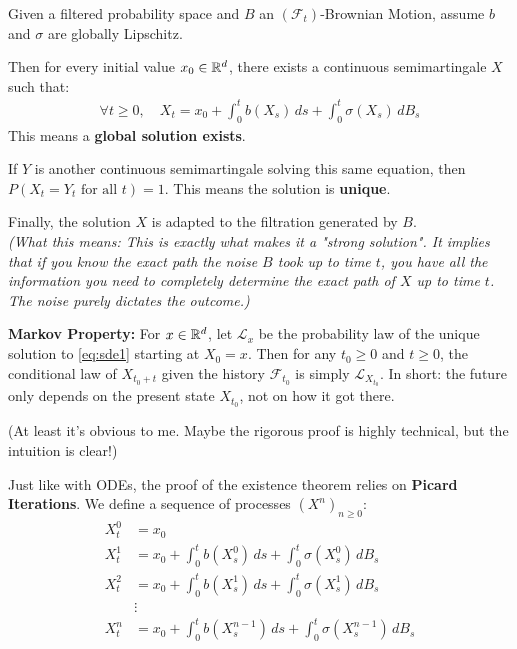 \begin{izrek}
    Given a filtered probability space and $B$ an $(\mathcal{F}_t)$-Brownian Motion, assume $b$ and $\sigma$ are globally Lipschitz. 
    
    Then for every initial value $x_0 \in \mathbb{R}^d$, there exists a continuous semimartingale $X$ such that:
    \begin{align}
        \forall t \geq 0, \quad X_t = x_0 + \int_0^t b(X_s) \, ds + \int_0^t \sigma(X_s) \, dB_s
        \label{eq:sde1}
    \end{align}
    This means a \textbf{global solution exists}.

    If $Y$ is another continuous semimartingale solving this same equation, then $P(X_t = Y_t \text{ for all } t) = 1$. This means the solution is \textbf{unique}.

    Finally, the solution $X$ is adapted to the filtration generated by $B$. \\
    \textit{(What this means: This is exactly what makes it a "strong solution". It implies that if you know the exact path the noise $B$ took up to time $t$, you have all the information you need to completely determine the exact path of $X$ up to time $t$. The noise purely dictates the outcome.)}
\end{izrek}

\textbf{Markov Property:} For $x \in \mathbb{R}^d$, let $\mathcal{L}_x$ be the probability law of the unique solution to \eqref{eq:sde1} starting at $X_0 = x$. Then for any $t_0 \geq 0$ and $t \ge 0$, the conditional law of $X_{t_0+t}$ given the history $\mathcal{F}_{t_0}$ is simply $\mathcal{L}_{X_{t_0}}$. 
In short: the future only depends on the present state $X_{t_0}$, not on how it got there.

\obvs
(At least it's obvious to me. Maybe the rigorous proof is highly technical, but the intuition is clear!)

Just like with ODEs, the proof of the existence theorem relies on \textbf{Picard Iterations}. We define a sequence of processes $(X^n)_{n \geq 0}$:
\begin{align*}
    X_t^0 &= x_0 \\
    X_t^1 &= x_0 + \int_0^t b(X_s^0) \, ds + \int_0^t \sigma(X_s^0) \, dB_s \\
    X_t^2 &= x_0 + \int_0^t b(X_s^1) \, ds + \int_0^t \sigma(X_s^1) \, dB_s \\
    &\vdots \\
    X_t^n &= x_0 + \int_0^t b(X_s^{n-1}) \, ds + \int_0^t \sigma(X_s^{n-1}) \, dB_s
\end{align*}

